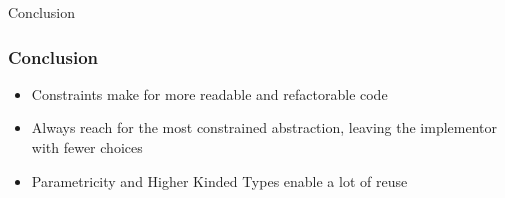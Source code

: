 \begin{section}{Conclusion}
\begin{frame}
\frametitle{Conclusion}
\begin{itemize}
\item Constraints make for more readable and refactorable code
\item Always reach for the most constrained abstraction, leaving the implementor with fewer choices
\item Parametricity and Higher Kinded Types enable a lot of reuse
\end{itemize}
\end{frame}
\end{section}
